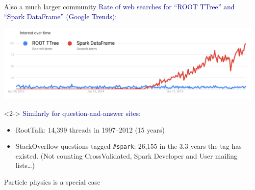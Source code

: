 \documentclass[aspectratio=169]{beamer}
\begin{document}
\begin{frame}{Also a much larger community}
\vspace{0.35 cm}
\textcolor{darkblue}{Rate of web searches for ``ROOT TTree'' and ``Spark DataFrame'' (Google Trends):}

\includegraphics[width=\linewidth]{root-spark-google-trends.png}

\vfill
\begin{uncoverenv}<2->
\textcolor{darkblue}{Similarly for question-and-answer sites:}
\begin{itemize}
\item RootTalk: 14,399 threads in 1997--2012 (15 years)
\item StackOverflow questions tagged {\tt \small \#spark}: 26,155 in the 3.3 years the tag has existed. (Not counting CrossValidated, Spark Developer and User mailing lists\ldots)
\end{itemize}
\end{uncoverenv}

\vfill
{}
\end{frame}

\begin{frame}{Particle physics is a special case}



\end{frame}




\end{document}

